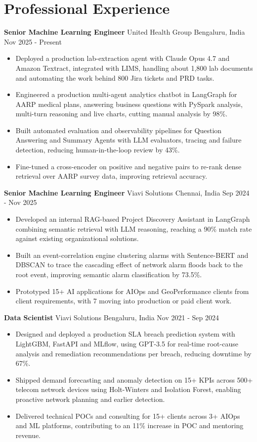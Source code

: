 \documentclass[10pt,a4paper]{article}
\newcommand{\role}[4]{\textbf{#1} \textbar{} #2 \hfill #3 \textbar{} #4\par}
\begin{document}
\section{Professional Experience}
\role{Senior Machine Learning Engineer}{United Health Group}{Bengaluru, India}{Nov 2025 - Present}
\begin{itemize}
  \item Deployed a production lab-extraction agent with Claude Opus 4.7 and Amazon Textract, integrated with LIMS, handling about 1,800 lab documents and automating the work behind 800 Jira tickets and PRD tasks.
  \item Engineered a production multi-agent analytics chatbot in LangGraph for AARP medical plans, answering business questions with PySpark analysis, multi-turn reasoning and live charts, cutting manual analysis by 98\%.
  \item Built automated evaluation and observability pipelines for Question Answering and Summary Agents with LLM evaluators, tracing and failure detection, reducing human-in-the-loop review by 43\%.
  \item Fine-tuned a cross-encoder on positive and negative pairs to re-rank dense retrieval over AARP survey data, improving retrieval accuracy.
\end{itemize}
\vspace{3pt}
\role{Senior Machine Learning Engineer}{Viavi Solutions}{Chennai, India}{Sep 2024 - Nov 2025}
\begin{itemize}
  \item Developed an internal RAG-based Project Discovery Assistant in LangGraph combining semantic retrieval with LLM reasoning, reaching a 90\% match rate against existing organizational solutions.
  \item Built an event-correlation engine clustering alarms with Sentence-BERT and DBSCAN to trace the cascading effect of network alarm floods back to the root event, improving semantic alarm classification by 73.5\%.
  \item Prototyped 15+ AI applications for AIOps and GeoPerformance clients from client requirements, with 7 moving into production or paid client work.
\end{itemize}
\vspace{3pt}
\role{Data Scientist}{Viavi Solutions}{Bengaluru, India}{Nov 2021 - Sep 2024}
\begin{itemize}
  \item Designed and deployed a production SLA breach prediction system with LightGBM, FastAPI and MLflow, using GPT-3.5 for real-time root-cause analysis and remediation recommendations per breach, reducing downtime by 67\%.
  \item Shipped demand forecasting and anomaly detection on 15+ KPIs across 500+ telecom network devices using Holt-Winters and Isolation Forest, enabling proactive network planning and earlier detection.
  \item Delivered technical POCs and consulting for 15+ clients across 3+ AIOps and ML platforms, contributing to an 11\% increase in POC and mentoring revenue.
\end{itemize}
\end{document}
